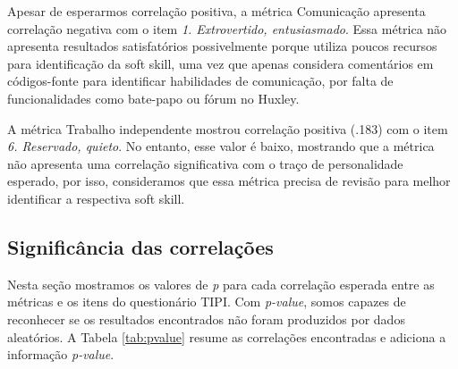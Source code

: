 Apesar de esperarmos correlação positiva, a métrica Comunicação apresenta correlação negativa com o item \textit{1. Extrovertido, entusiasmado}.
Essa métrica não apresenta resultados satisfatórios possivelmente porque utiliza poucos recursos para identificação da soft skill,
uma vez que apenas considera comentários em códigos-fonte para identificar habilidades de comunicação,
por falta de funcionalidades como bate-papo ou fórum no Huxley.

A métrica Trabalho independente mostrou correlação positiva (.183) com o item \textit{6. Reservado, quieto}. No entanto, esse valor é baixo, mostrando que a métrica não apresenta uma correlação significativa com o traço de personalidade esperado, por isso, consideramos que essa métrica precisa de revisão para melhor identificar a respectiva soft skill.  

\subsection{Significância das correlações}

Nesta seção mostramos os valores de \textit{p} para cada correlação esperada entre as métricas e os itens do questionário TIPI.
Com \textit{p-value}, somos capazes de reconhecer se os resultados encontrados não foram produzidos por dados aleatórios.
A Tabela \ref{tab:pvalue} resume as correlações encontradas e adiciona a informação \textit{p-value}.

